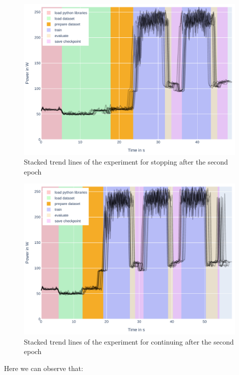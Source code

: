 \begin{figure}
    \includegraphics[width=\linewidth]{power-measurements/stacked_plots/roberta_stop_after_saving.pdf}
    \caption{Stacked trend lines of the experiment for stopping after the second epoch}
    \label{fig:plot_partial_saved_stacked}
\end{figure}

\begin{figure}
    \includegraphics[width=\linewidth]{power-measurements/stacked_plots/roberta_continue_after_saving.pdf}
    \caption{Stacked trend lines of the experiment for continuing after the second epoch}
    \label{fig:plot_partial_saved_continue_stacked}
\end{figure}

Here we can observe that:

